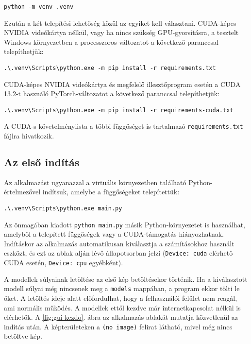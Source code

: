 \begin{lstlisting}[caption={A virtuális környezet létrehozása}, label={lst:install}]
python -m venv .venv
\end{lstlisting}

Ezután a két telepítési lehetőség közül az egyiket kell választani. 
CUDA-képes NVIDIA videókártya nélkül, vagy ha nincs szükség GPU-gyorsításra, a tesztelt Windows-környezetben a 
processzoros változatot a következő paranccsal telepíthetjük: 
\begin{lstlisting}
.\.venv\Scripts\python.exe -m pip install -r requirements.txt
\end{lstlisting}

CUDA-képes NVIDIA videókártya és megfelelő illesztőprogram esetén a CUDA 13.2-t használó PyTorch-változatot a 
következő paranccsal telepíthetjük: 
\begin{lstlisting}
.\.venv\Scripts\python.exe -m pip install -r requirements-cuda.txt
\end{lstlisting}
A CUDA-s követelménylista a többi függőséget is tartalmazó \texttt{requirements.txt} fájlra hivatkozik. 

\subsection{Az első indítás}
Az alkalmazást ugyanazzal a virtuális környezetben található Python-értelmezővel indítsuk, amelybe a függőségeket telepítettük: 
\begin{lstlisting}
.\.venv\Scripts\python.exe main.py
\end{lstlisting}
Az önmagában kiadott \texttt{python main.py} másik Python-környezetet is használhat, amelyből a telepített függőségek vagy 
a CUDA-támogatás hiányozhatnak. 
Indításkor az alkalmazás automatikusan kiválasztja a számításokhoz használt eszközt, és ezt az ablak alján lévő 
állapotsorban jelzi (\texttt{Device: cuda} elérhető CUDA esetén, \texttt{Device: cpu} egyébként). 

A modellek súlyainak letöltése az első kép betöltésekor történik. 
Ha a kiválasztott modell súlyai még nincsenek meg a \texttt{models} mappában, a program ekkor tölti le őket. 
A letöltés ideje alatt előfordulhat, hogy a felhasználói felület nem reagál, ami normális működés. 
A modellek ettől kezdve már internetkapcsolat nélkül is elérhetők. 
A \ref{fig:gui-kezdo}. ábra az alkalmazás ablakát mutatja közvetlenül az indítás után. 
A képterületeken a \texttt{(no image)} felirat látható, mivel még nincs betöltve kép. 

